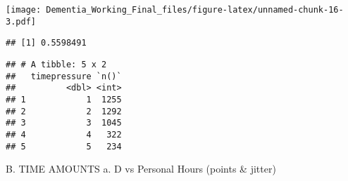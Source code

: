 \documentclass[]{article}
\newenvironment{Shaded}{\begin{snugshade}}{\end{snugshade}}
\newcommand{\DecValTok}[1]{\textcolor[rgb]{0.00,0.00,0.81}{#1}}
\newcommand{\KeywordTok}[1]{\textcolor[rgb]{0.13,0.29,0.53}{\textbf{#1}}}
\newcommand{\NormalTok}[1]{#1}
\newcommand{\OperatorTok}[1]{\textcolor[rgb]{0.81,0.36,0.00}{\textbf{#1}}}
\newcommand{\StringTok}[1]{\textcolor[rgb]{0.31,0.60,0.02}{#1}}
\begin{document}
\texttt{[image: Dementia\_Working\_Final\_files/figure-latex/unnamed-chunk-16-3.pdf]}

\begin{Shaded}
\end{Shaded}

\begin{verbatim}
## [1] 0.5598491
\end{verbatim}

\begin{Shaded}
\end{Shaded}

\begin{verbatim}
## # A tibble: 5 x 2
##   timepressure `n()`
##          <dbl> <int>
## 1            1  1255
## 2            2  1292
## 3            3  1045
## 4            4   322
## 5            5   234
\end{verbatim}

B. TIME AMOUNTS a. D vs Personal Hours (points \& jitter)
\end{document}
